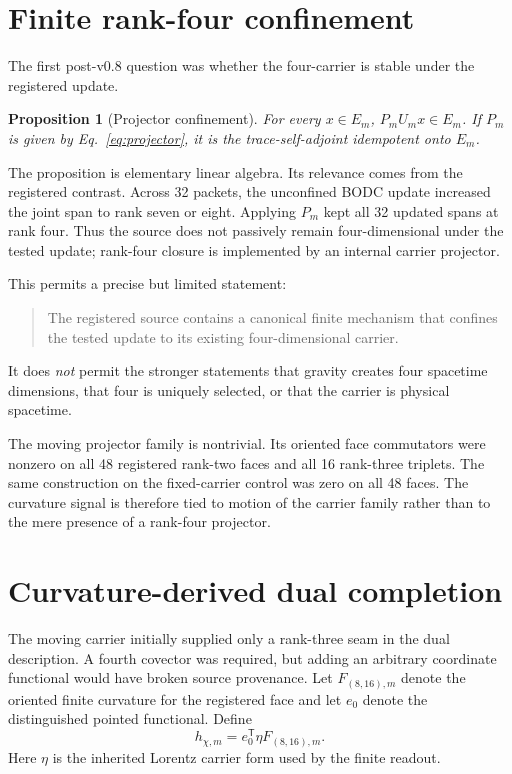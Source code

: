 \documentclass[12pt,a4paper,twoside]{article}
\newtheorem{proposition}{Proposition}
\begin{document}
\section{Finite rank-four confinement}

The first post-v0.8 question was whether the four-carrier is stable under the registered update.

\begin{proposition}[Projector confinement]
For every $x\in E_m$, $P_mU_mx\in E_m$. If $P_m$ is given by Eq.~\eqref{eq:projector}, it is the trace-self-adjoint idempotent onto $E_m$.
\end{proposition}

The proposition is elementary linear algebra. Its relevance comes from the registered contrast. Across 32 packets, the unconfined BODC update increased the joint span to rank seven or eight. Applying $P_m$ kept all 32 updated spans at rank four. Thus the source does not passively remain four-dimensional under the tested update; rank-four closure is implemented by an internal carrier projector.

This permits a precise but limited statement:
\begin{quote}
The registered source contains a canonical finite mechanism that confines the tested update to its existing four-dimensional carrier.
\end{quote}
It does \emph{not} permit the stronger statements that gravity creates four spacetime dimensions, that four is uniquely selected, or that the carrier is physical spacetime.

The moving projector family is nontrivial. Its oriented face commutators were nonzero on all 48 registered rank-two faces and all 16 rank-three triplets. The same construction on the fixed-carrier control was zero on all 48 faces. The curvature signal is therefore tied to motion of the carrier family rather than to the mere presence of a rank-four projector.

\section{Curvature-derived dual completion}

The moving carrier initially supplied only a rank-three seam in the dual description. A fourth covector was required, but adding an arbitrary coordinate functional would have broken source provenance. Let $F_{(8,16),m}$ denote the oriented finite curvature for the registered face and let $e_0$ denote the distinguished pointed functional. Define
\begin{equation}
h_{\chi,m}=e_0^{\mathsf T}\eta F_{(8,16),m}.
\label{eq:hchi}
\end{equation}
Here $\eta$ is the inherited Lorentz carrier form used by the finite readout.
\end{document}
